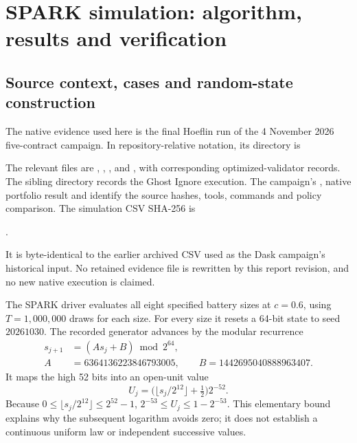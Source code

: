 \chapter{SPARK simulation: algorithm, results and verification}
\label{sec:hf-spark-study}
\section{Source context, cases and random-state construction}
The native evidence used here is the final Hoeflin run of the 4 November
2026 five-contract campaign. In repository-relative notation, its directory is
\begin{center}
\small{}\par
{}
\end{center}
The relevant files are , ,
,  and
, with corresponding optimized-validator records.
The sibling  directory records the Ghost Ignore execution.
The campaign's , native portfolio result and
 identify the source hashes, tools,
commands and policy comparison. The simulation CSV SHA-256 is
\begin{center}\small
{}.
\end{center}
It is byte-identical to the earlier archived CSV used as the Dask
campaign's historical input. No retained evidence file is rewritten by
this report revision, and no new native execution is claimed.

The SPARK driver evaluates all eight specified battery sizes at
\(c=0.6\), using \(T=1{,}000{,}000\) draws for each size. For every
size it resets a 64-bit state to seed \(20261030\). The recorded generator
advances by the modular recurrence
\begin{align*}
 s_{j+1}&=(A s_j+B)\bmod 2^{64},\\
 A&=6364136223846793005,\qquad B=1442695040888963407.
\end{align*}
It maps the high 52 bits into an open-unit value
\[
 U_j=\bigl(\lfloor s_j/2^{12}\rfloor+\tfrac12\bigr)2^{-52}.
\]
Because \(0\leq\lfloor s_j/2^{12}\rfloor\leq2^{52}-1\),
\(2^{-53}\leq U_j\leq1-2^{-53}\). This elementary bound explains
why the subsequent logarithm avoids zero; it does not establish a
continuous uniform law or independent successive values.

